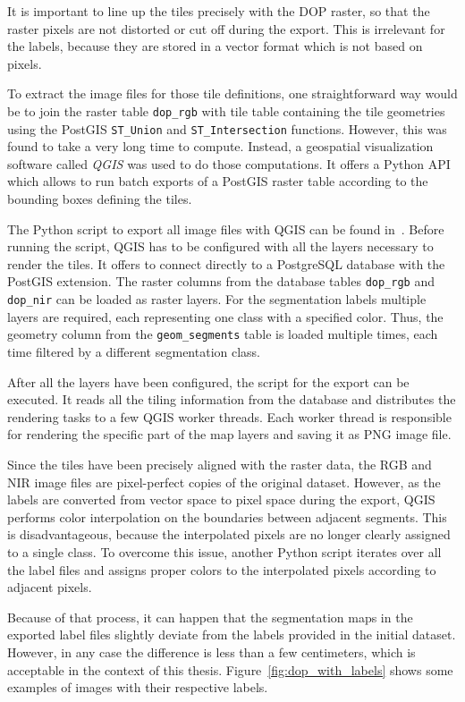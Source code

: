 It is important to line up the tiles precisely with the DOP raster, so that the raster pixels are not distorted or cut off during the export. This is irrelevant for the labels, because they are stored in a vector format which is not based on pixels.

To extract the image files for those tile definitions, one straightforward way would be to join the raster table \texttt{dop\_rgb} with tile table containing the tile geometries using the PostGIS \texttt{ST\_Union} and \texttt{ST\_Intersection} functions. However, this was found to take a very long time to compute. Instead, a geospatial visualization software called \emph{QGIS} was used to do those computations. It offers a Python API which allows to run batch exports of a PostGIS raster table according to the bounding boxes defining the tiles.

The Python script to export all image files with QGIS can be found in~\cite[\texttt{scripts} folder]{thesis-code20}. Before running the script, QGIS has to be configured with all the layers necessary to render the tiles. It offers to connect directly to a PostgreSQL database with the PostGIS extension. The raster columns from the database tables \texttt{dop\_rgb} and \texttt{dop\_nir} can be loaded as raster layers. For the segmentation labels multiple layers are required, each representing one class with a specified color. Thus, the geometry column from the \texttt{geom\_segments} table is loaded multiple times, each time filtered by a different segmentation class.

After all the layers have been configured, the script for the export can be executed. It reads all the tiling information from the database and distributes the rendering tasks to a few QGIS worker threads. Each worker thread is responsible for rendering the specific part of the map layers and saving it as PNG image file.

Since the tiles have been precisely aligned with the raster data, the RGB and NIR image files are pixel-perfect copies of the original dataset. However, as the labels are converted from vector space to pixel space during the export, QGIS performs color interpolation on the boundaries between adjacent segments. This is disadvantageous, because the interpolated pixels are no longer clearly assigned to a single class. To overcome this issue, another Python script iterates over all the label files and assigns proper colors to the interpolated pixels according to adjacent pixels.

Because of that process, it can happen that the segmentation maps in the exported label files slightly deviate from the labels provided in the initial dataset. However, in any case the difference is less than a few centimeters, which is acceptable in the context of this thesis. Figure~\ref{fig:dop_with_labels} shows some examples of images with their respective labels.

